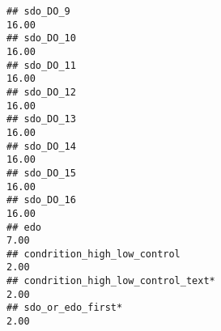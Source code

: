 \documentclass[
]{article}
\begin{document}
\begin{verbatim}
## sdo_DO_9                                                                                                                                                                                                                      16.00
## sdo_DO_10                                                                                                                                                                                                                     16.00
## sdo_DO_11                                                                                                                                                                                                                     16.00
## sdo_DO_12                                                                                                                                                                                                                     16.00
## sdo_DO_13                                                                                                                                                                                                                     16.00
## sdo_DO_14                                                                                                                                                                                                                     16.00
## sdo_DO_15                                                                                                                                                                                                                     16.00
## sdo_DO_16                                                                                                                                                                                                                     16.00
## edo                                                                                                                                                                                                                            7.00
## condrition_high_low_control                                                                                                                                                                                                    2.00
## condrition_high_low_control_text*                                                                                                                                                                                              2.00
## sdo_or_edo_first*                                                                                                                                                                                                              2.00

\end{verbatim}
\end{document}
